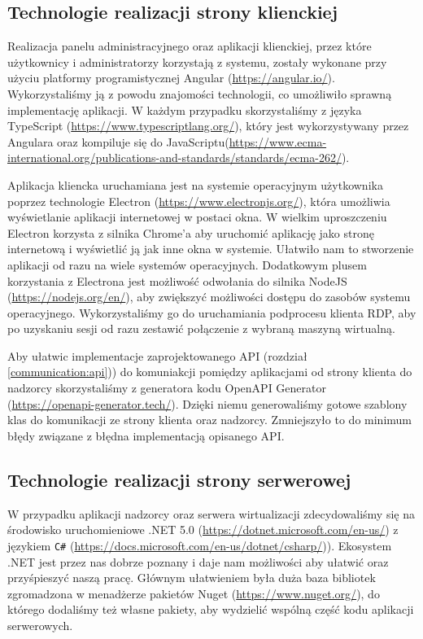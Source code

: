 \documentclass[../opis-rozwiazania.tex]{subfiles}
\begin{document}
\label{technologies}

\subsection{Technologie realizacji strony klienckiej}
Realizacja panelu administracyjnego oraz aplikacji klienckiej, przez które użytkownicy i administratorzy korzystają z systemu, zostały wykonane przy użyciu platformy programistycznej Angular (\url{https://angular.io/}).
Wykorzystaliśmy ją z powodu znajomości technologii, co umożliwiło sprawną implementację aplikacji.
W każdym przypadku skorzystaliśmy z języka TypeScript (\url{https://www.typescriptlang.org/}), który jest wykorzystywany przez Angulara oraz kompiluje się do JavaScriptu(\url{https://www.ecma-international.org/publications-and-standards/standards/ecma-262/}).

Aplikacja kliencka uruchamiana jest na systemie operacyjnym użytkownika poprzez technologie Electron (\url{https://www.electronjs.org/}), która umożliwia wyświetlanie aplikacji internetowej w postaci okna.
W wielkim uproszczeniu Electron korzysta z silnika Chrome'a aby uruchomić aplikację jako stronę internetową i wyświetlić ją jak inne okna w systemie.
Ułatwiło nam to stworzenie aplikacji od razu na wiele systemów operacyjnych.
Dodatkowym plusem korzystania z Electrona jest możliwość odwołania do silnika NodeJS (\url{https://nodejs.org/en/}), aby zwiększyć możliwości dostępu do zasobów systemu operacyjnego.
Wykorzystaliśmy go do uruchamiania podprocesu klienta RDP, aby po uzyskaniu sesji od razu zestawić połączenie z wybraną maszyną wirtualną.

Aby ułatwic implementacje zaprojektowanego API (rozdział \ref{communication:api})) do komuniakcji pomiędzy aplikacjami od strony klienta do nadzorcy skorzystaliśmy z generatora kodu OpenAPI Generator (\url{https://openapi-generator.tech/}).
Dzięki niemu generowaliśmy gotowe szablony klas do komunikacji ze strony klienta oraz nadzorcy.
Zmniejszyło to do minimum błędy związane z błędna implementacją opisanego API.

\subsection{Technologie realizacji strony serwerowej}
W przypadku aplikacji nadzorcy oraz serwera wirtualizacji zdecydowaliśmy się na środowisko uruchomieniowe .NET 5.0 (\url{https://dotnet.microsoft.com/en-us/}) z językiem \texttt{C\#} (\url{https://docs.microsoft.com/en-us/dotnet/csharp/})).
Ekosystem .NET jest przez nas dobrze poznany i daje nam możliwości aby ułatwić oraz przyśpieszyć naszą pracę.
Głównym ułatwieniem była duża baza bibliotek zgromadzona w menadżerze pakietów Nuget (\url{https://www.nuget.org/}), do którego dodaliśmy też własne pakiety, aby wydzielić wspólną część kodu aplikacji serwerowych.
\end{document}
